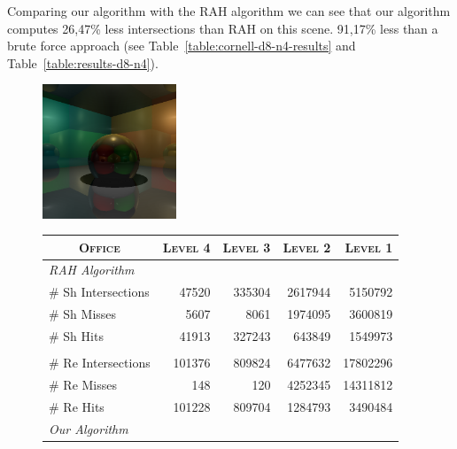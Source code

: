
Comparing our algorithm with the RAH algorithm we can see that our algorithm computes 26,47\% less intersections than RAH on this scene. 91,17\% less than a brute force approach (see Table~\ref{table:cornell-d8-n4-results} and Table~\ref{table:results-d8-n4}).


\begin{figure}[!htb]
    \begin{minipage}{0.25\linewidth}
        \centering
        \includegraphics[width=4.0cm]{Images/Cornell_Preview}
    \end{minipage}
    \begin{minipage}{0.725\linewidth}
        \centering
        \fontsize{8}{10}
        \selectfont
        \begin{tabular}[h]{l|rrrr}
            \multicolumn{1}{c|}{\textsc{Office}} & \textsc{Level 4} & \textsc{Level 3} & \textsc{Level 2} & \textsc{Level 1}\\
            \hline
            \emph{RAH Algorithm} & & \\
            \hline
            \quad \# Sh Intersections   & 47520	    & 335304    & 2617944	& 5150792   \\
            \quad \# Sh Misses          & 5607	    & 8061		& 1974095	& 3600819	\\
            \quad \# Sh Hits            & 41913	    & 327243	& 643849	& 1549973	\\
            & & \\
            \quad \# Re Intersections   & 101376    & 809824	& 6477632   & 17802296  \\
            \quad \# Re Misses          & 148	    & 120	    & 4252345	& 14311812	\\
            \quad \# Re Hits            & 101228	& 809704	& 1284793	& 3490484	\\
            \hline
            \emph{Our Algorithm} & & \\

\end{tabular}
\end{minipage}
\end{figure}

